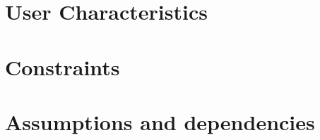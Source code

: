   \section{User Characteristics}
  
  \section{Constraints}
  
  \section{Assumptions and dependencies}
  
  


  

